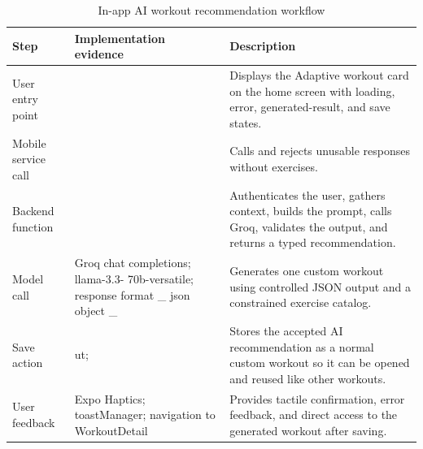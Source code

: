 \documentclass[12pt,a4paper,openany]{report}
\begin{document}
\begingroup
\footnotesize
\setlength{\tabcolsep}{3pt}
\renewcommand{\arraystretch}{1.20}
\setlength{\LTpre}{5pt}
\setlength{\LTpost}{10pt}
\begin{longtable}{|L{3.67cm}|L{5.29cm}|L{5.73cm}|}
\caption{In-app AI workout recommendation workflow}\label{tab:pdf-81-38} \\
\hline
Step & Implementation evidence & Description \\ \hline
User entry point &  & Displays the Adaptive workout card on the home screen with loading, error, generated-result, and save states. \\ \hline
Mobile service call &  & Calls  and rejects unusable responses without exercises. \\ \hline
Backend function &  & Authenticates the user, gathers context, builds the prompt, calls Groq, validates the output, and returns a typed recommendation. \\ \hline
Model call & Groq chat completions; llama-3.3- 70b-versatile; response format \_ json object \_ & Generates one custom workout using controlled JSON output and a constrained exercise catalog. \\ \hline
Save action &  ut;  & Stores the accepted AI recommendation as a normal custom workout so it can be opened and reused like other workouts. \\ \hline
User feedback & Expo Haptics; toastManager; navigation to WorkoutDetail & Provides tactile confirmation, error feedback, and direct access to the generated workout after saving. \\ \hline
\end{longtable}
\endgroup
\end{document}
